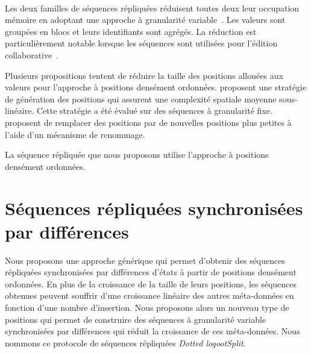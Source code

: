 
\paragraph{}Les deux familles de séquences répliquées réduisent toutes deux leur occupation mémoire en adoptant une approche à granularité variable~\cite{yu_2012_string-wise-crdt, andre_2013_logootsplit, briot_2016_rgasplit}.
Les valeurs sont groupées en blocs et leurs identifiants sont agrégés.
La réduction est particulièrement notable lorsque les séquences sont utilisées pour l'édition collaborative~\autocite{andre_2013_logootsplit,briot_2016_rgasplit}.

Plusieurs propositions tentent de réduire la taille des positions allouées aux valeurs pour l'approche à positions densément ordonnées.
\textcite{nedelec_2013_lseq} proposent une stratégie de génération des positions qui assurent une complexité spatiale moyenne sous-linéaire.
Cette stratégie a été évalué sur des séquences à granularité fixe.
\textcite{nicolas2020_renaming} proposent de remplacer des positions par de nouvelles positions plus petites à l'aide d'un mécanisme de renommage.


La séquence répliquée que nous proposons utilise l'approche à positions densément ordonnées.



\section{Séquences répliquées synchronisées par différences}\label{sec:delta-seq}


Nous proposons une approche générique qui permet d'obtenir des séquences répliquées synchronisées par différences d'états à partir de positions densément ordonnées.
En plus de la croissance de la taille de leurs positions, les séquences obtenues peuvent souffrir d'une croissance linéaire des autres méta-données en fonction d'une nombre d'insertion.
Nous proposons alors un nouveau type de positions qui permet de construire des séquences à granularité variable synchronisées par différences qui réduit la croissance de ces méta-données.
Nous nommons ce protocole de séquences répliquées \emph{Dotted logootSplit}.

